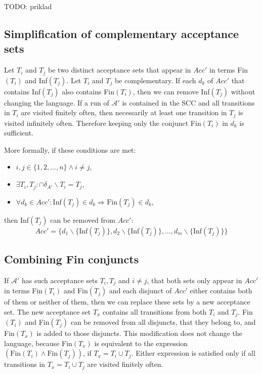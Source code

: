 \documentclass[
  digital, %
  twoside, %
  table,   %
  lof,     %
  lot,     %
]{fithesis3}
\begin{document}
TODO: priklad

\subsection{Simplification of complementary acceptance sets}
Let $T_i$ and $T_j$ be two distinct acceptance sets that appear in $Acc'$ in terms Fin$(T_i)$ and Inf$(T_j)$. Let $T_i$ and $T_j$ be complementary. If each $d_k$ of $Acc'$ that contains Inf$(T_j)$ also contains Fin$(T_i)$, then we can remove Inf$(T_j)$ without changing the language. If a run of $\mathcal{A'}$ is contained in the SCC and all transitions in $T_i$ are visited finitely often, then necessarily at least one transition in $T_j$ is visited infinitely often. Therefore keeping only the conjunct Fin$(T_i)$ in $d_k$ is sufficient. 

More formally, if these conditions are met:
\begin{itemize}
  \item $i, j \in \{1, 2, \dots, n\} \wedge i \neq j$,
  \item $\exists T_i, T_j \colon \cap \delta_{A'} \smallsetminus T_i = T_j$,
  \item $\forall d_k \in Acc' \colon \text{Inf}(T_j) \in d_k \Rightarrow \text{Fin}(T_j) \in d_k$,
\end{itemize}
then Inf$(T_j)$ can be removed from $Acc'$:
\begin{equation*}
  Acc' = \{d_1 \smallsetminus \{\text{Inf}(T_j)\}, d_2 \smallsetminus \{\text{Inf}(T_j)\}, \dots, d_m \smallsetminus \{\text{Inf}(T_j)\} \}
\end{equation*}

\subsection{Combining Fin conjuncts}
If $\mathcal{A'}$ has such acceptance sets $T_i, T_j$ and $i \neq j$, that both sets only appear in $Acc'$ in terms Fin$(T_i)$ and Fin$(T_j)$ and each disjunct of $Acc'$ either contains both of them or neither of them, then we can replace these sets by a new acceptance set. The new acceptance set $T_x$ contains all transitions from both $T_i$ and $T_j$. Fin$(T_i)$ and Fin$(T_j)$ can be removed from all disjuncts, that they belong to, and Fin$(T_x)$ is added to those disjuncts. This modification does not change the language, because Fin$(T_x)$ is equivalent to the expression $(\text{Fin}(T_i) \wedge \text{Fin}(T_j))$, if $T_x = T_i \cup T_j$. Either expression is satisfied only if all transitions in $T_x = T_i \cup T_j$ are visited finitely often.
\end{document}
